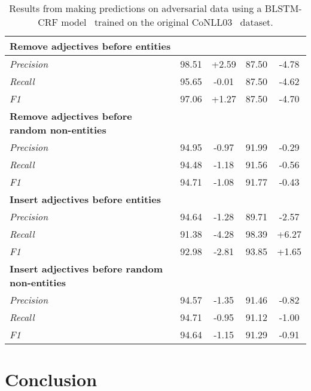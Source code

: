 \begin{table}[t]
\begin{singlespace}
\begin{tabular}{@{} R{0.17\textwidth} c c c c @{}}
        \textbf{Remove adjectives before entities} &&&&       \\\midrule
            \textit{Precision}  & 98.51 & +2.59 & 87.50 & -4.78   \\ 
            \textit{Recall}     & 95.65 & -0.01 & 87.50 & -4.62   \\ 
            \textit{F1}         & 97.06 & +1.27 & 87.50 & -4.70   \\\bottomrule %
        \textbf{Remove adjectives before random non-entities} &&&&     \\\midrule
            \textit{Precision}  & 94.95 & -0.97 & 91.99 & -0.29   \\ 
            \textit{Recall}     & 94.48 & -1.18 & 91.56 & -0.56   \\ 
            \textit{F1}         & 94.71 & -1.08 & 91.77 & -0.43   \\\bottomrule
        \textbf{Insert adjectives before entities} &&&&        \\\midrule
            \textit{Precision}  & 94.64 & -1.28 & 89.71 & -2.57   \\ 
            \textit{Recall}     & 91.38 & -4.28 & 98.39 & +6.27   \\ 
            \textit{F1}         & 92.98 & -2.81 & 93.85 & +1.65   \\\bottomrule
            
        \textbf{Insert adjectives before random non-entities} &&&&       \\\midrule
            \textit{Precision}  & 94.57 & -1.35 & 91.46 & -0.82   \\ 
            \textit{Recall}     & 94.71 & -0.95 & 91.12 & -1.00   \\ 
            \textit{F1}         & 94.64 & -1.15 & 91.29 & -0.91   \\\bottomrule

        \hline
    \end{tabular}
    \end{singlespace}
    \caption{Results from making predictions on adversarial data using a BLSTM-CRF model~\citep{DBLP:conf/acl/MaH16} trained on the original CoNLL03~\citep{conll} dataset.}
    \label{tab:adverdata}
\end{table} %






\section{Conclusion}